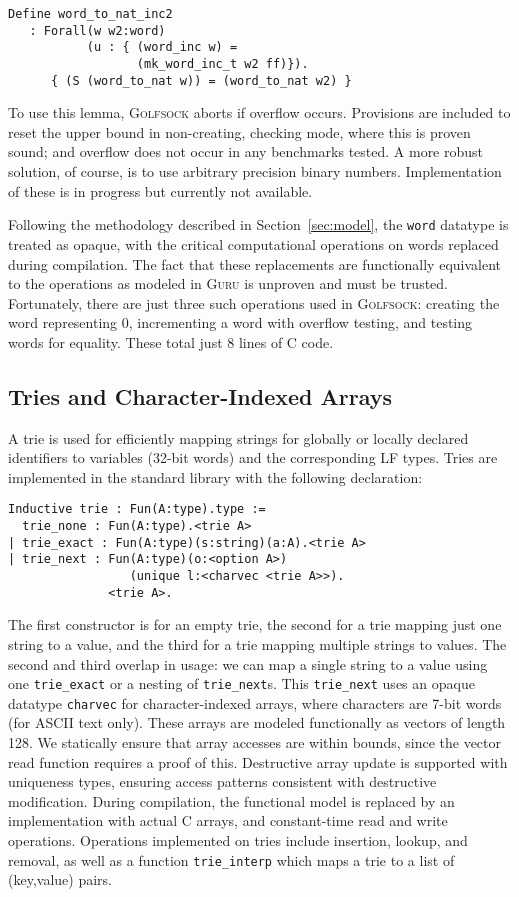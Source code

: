 \documentclass[preprint,natbib]{sigplanconf}
\begin{document}
\begin{verbatim}
Define word_to_nat_inc2
   : Forall(w w2:word)
           (u : { (word_inc w) = 
                  (mk_word_inc_t w2 ff)}).
      { (S (word_to_nat w)) = (word_to_nat w2) }
\end{verbatim}

\noindent To use this lemma, \textsc{Golfsock} aborts if overflow
occurs.  Provisions are included to reset the upper bound in
non-creating, checking mode, where this is proven sound; and overflow
does not occur in any benchmarks tested.  A more robust solution, of
course, is to use arbitrary precision binary numbers.  Implementation
of these is in progress but currently not available.

Following the methodology described in Section~\ref{sec:model}, the
\texttt{word} datatype is treated as opaque, with the critical
computational operations on words replaced during compilation.  The
fact that these replacements are functionally equivalent to the
operations as modeled in \textsc{Guru} is unproven and must be
trusted.  Fortunately, there are just three such operations used in
\textsc{Golfsock}: creating the word representing 0, incrementing a
word with overflow testing, and testing words for equality.  These
total just 8 lines of C code.

\subsection{Tries and Character-Indexed Arrays}

A trie is used for efficiently mapping strings for globally or locally
declared identifiers to variables (32-bit words) and the corresponding
LF types.  Tries are implemented in the standard library with the
following declaration:

\begin{verbatim}
Inductive trie : Fun(A:type).type :=
  trie_none : Fun(A:type).<trie A>
| trie_exact : Fun(A:type)(s:string)(a:A).<trie A>
| trie_next : Fun(A:type)(o:<option A>)
                 (unique l:<charvec <trie A>>). 
              <trie A>.
\end{verbatim}

\noindent The first constructor is for an empty trie, the second for a
trie mapping just one string to a value, and the third for a trie
mapping multiple strings to values.  The second and third overlap in
usage: we can map a single string to a value using one
\texttt{trie\_exact} or a nesting of \texttt{trie\_next}s.  This
\texttt{trie\_next} uses an opaque datatype \texttt{charvec} for
character-indexed arrays, where characters are 7-bit words (for ASCII
text only).  These arrays are modeled functionally as vectors of
length 128.  We statically ensure that array accesses are within bounds,
since the vector read function requires a proof of this.  Destructive
array update is supported with uniqueness types, ensuring access
patterns consistent with destructive modification.  During
compilation, the functional model is replaced by an implementation
with actual C arrays, and constant-time read and write operations.
Operations implemented on tries include insertion, lookup, and
removal, as well as a function \texttt{trie\_interp} which maps a trie
to a list of (key,value) pairs.
\end{document}
